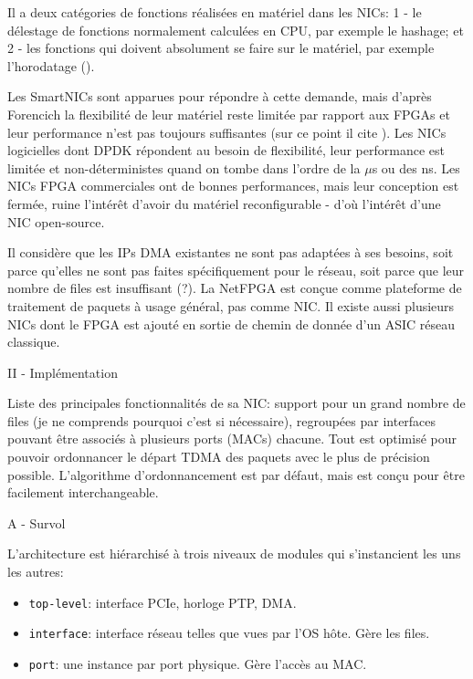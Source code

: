 Il a deux catégories de fonctions réalisées en matériel dans les NICs: 1 - le délestage de fonctions normalement calculées en CPU, par exemple le hashage; et 2 - les fonctions  qui doivent absolument se faire sur le matériel, par exemple l'horodatage ().

Les SmartNICs sont apparues pour répondre à cette demande, mais d'après Forencich la flexibilité de leur matériel reste limitée par rapport aux FPGAs et leur performance n'est pas toujours suffisantes (sur ce point il cite \cite{firestone_azure_nodate}). Les NICs logicielles dont DPDK répondent au besoin de flexibilité, leur performance est limitée et non-déterministes quand on tombe dans l'ordre de la $\mu$s ou des ns. Les NICs FPGA commerciales ont de bonnes performances, mais leur conception est fermée, ruine l'intérêt d'avoir du matériel reconfigurable - d'où l'intérêt d'une NIC open-source.

Il considère que les IPs DMA existantes ne sont pas adaptées à ses besoins, soit parce qu'elles ne sont pas faites spécifiquement pour le réseau, soit parce que leur nombre de files est insuffisant (?). La NetFPGA est conçue comme plateforme de traitement de paquets à usage général, pas comme NIC. Il existe aussi plusieurs NICs dont le FPGA est ajouté en sortie de chemin de donnée d'un ASIC réseau classique.

II - Implémentation

Liste des principales fonctionnalités de sa NIC: support pour un grand nombre de files (je ne comprends pourquoi c'est si nécessaire), regroupées par interfaces pouvant être associés à plusieurs ports (MACs) chacune. Tout est optimisé pour pouvoir ordonnancer le départ TDMA des paquets avec le plus de précision possible. L'algorithme d'ordonnancement est  par défaut, mais est conçu pour être facilement interchangeable.

A - Survol

L'architecture est hiérarchisé à trois niveaux de modules qui s'instancient les uns les autres:
\begin{itemize}
	\item \texttt{top-level}: interface PCIe, horloge PTP, DMA.
	\item \texttt{interface}: interface réseau telles que vues par l'OS hôte. Gère les files.
	\item \texttt{port}: une instance par port physique. Gère l'accès au MAC.
\end{itemize}

